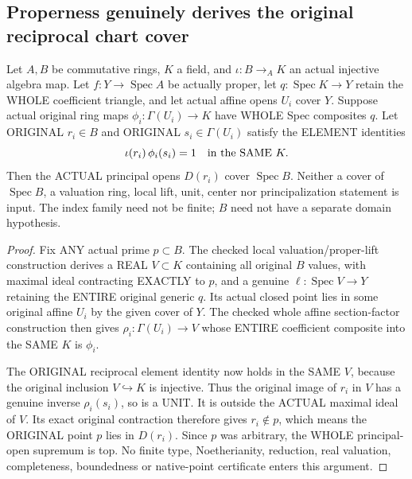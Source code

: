 \subsection{Properness genuinely derives the original reciprocal chart cover}

\begin{lemma}
\label{scheme:actual-proper-affine-reciprocal-cover}
\leanok
{}
Let $A,B$ be commutative rings, $K$ a field, and $\iota:B\to_A K$ an actual
injective algebra map.  Let $f:Y\to\operatorname{Spec}A$ be actually proper,
let $q:\operatorname{Spec}K\to Y$ retain the WHOLE coefficient triangle, and
let actual affine opens $U_i$ cover $Y$.  Suppose actual original ring maps
$\phi_i:\Gamma(U_i)\to K$ have WHOLE Spec composites $q$.  Let ORIGINAL
$r_i\in B$ and ORIGINAL $s_i\in\Gamma(U_i)$ satisfy the ELEMENT identities
\[
 \iota(r_i)\,\phi_i(s_i)=1\quad\hbox{in the SAME }K.
\]
Then the ACTUAL principal opens $D(r_i)$ cover $\operatorname{Spec}B$.
Neither a cover of $\operatorname{Spec}B$, a valuation ring, local lift,
unit, center nor principalization statement is input.  The index family
need not be finite; $B$ need not have a separate domain hypothesis.
\end{lemma}
\begin{proof}
Fix ANY actual prime $p\subset B$.  The checked local valuation/proper-lift
construction derives a REAL $V\subset K$ containing all original $B$ values,
with maximal ideal contracting EXACTLY to $p$, and a genuine
$\ell:\operatorname{Spec}V\to Y$ retaining the ENTIRE original generic $q$.
Its actual closed point lies in some original affine $U_i$ by the given cover
of $Y$.  The checked whole affine section-factor construction then gives
$\rho_i:\Gamma(U_i)\to V$ whose ENTIRE coefficient composite into the SAME
$K$ is $\phi_i$.

The ORIGINAL reciprocal element identity now holds in the SAME $V$, because
the original inclusion $V\hookrightarrow K$ is injective.  Thus the original
image of $r_i$ in $V$ has a genuine inverse $\rho_i(s_i)$, so is a UNIT.
It is outside the ACTUAL maximal ideal of $V$.  Its exact original contraction
therefore gives $r_i\notin p$, which means the ORIGINAL point $p$ lies in
$D(r_i)$.  Since $p$ was arbitrary, the WHOLE principal-open supremum is top.
No finite type, Noetherianity, reduction, real valuation, completeness,
boundedness or native-point certificate enters this argument.
\end{proof}
